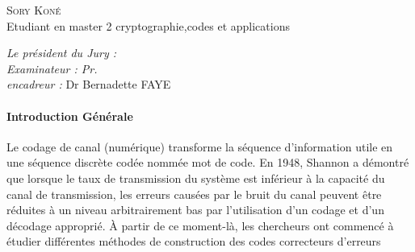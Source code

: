 \documentclass[12pt,openany]{report}
\begin{document}
\begin{titlepage}
\begin{sffamily}
\begin{center}
\begin{minipage}{0.4\textwidth}
     \begin{flushleft} \large
      \textsc{Sory Koné}\\
      Etudiant en master 2 cryptographie,codes et applications
     \end{flushleft}
    \end{minipage}
     \begin{minipage}{0.4\textwidth}
     \begin{flushright} \large
     \emph{Le président du Jury :} \\
     \emph{Examinateur : Pr.} \\
      \emph{encadreur :} Dr Bernadette FAYE\\
      
     \end{flushright}
    \end{minipage}
    \vfill
    {\large \date{\today} }
    
  \end{center}
  \end{sffamily}
\end{titlepage}

\dominitoc\tableofcontents
\newpage
\listoftables
\listoffigures
\clearpage
{}



\paragraph{\Huge{Introduction Générale}\\} 

\minitoc

Le codage de canal (numérique) transforme la
séquence d'information utile en une séquence
discrète codée nommée mot de code.\hspace{0.2cm}
En 1948, Shannon \cite{Shannon} a démontré que lorsque le
taux de transmission du système est inférieur à la
capacité du canal de transmission,\hspace{0.2cm} les erreurs
causées par le bruit du canal peuvent être réduites à
un niveau arbitrairement bas par l'utilisation d'un
codage et d'un décodage approprié.\hspace{0.2cm} À partir de ce
moment-là,\hspace{0.2cm} les chercheurs ont commencé à étudier
différentes méthodes de construction des codes
correcteurs d'erreurs
\end{document}
